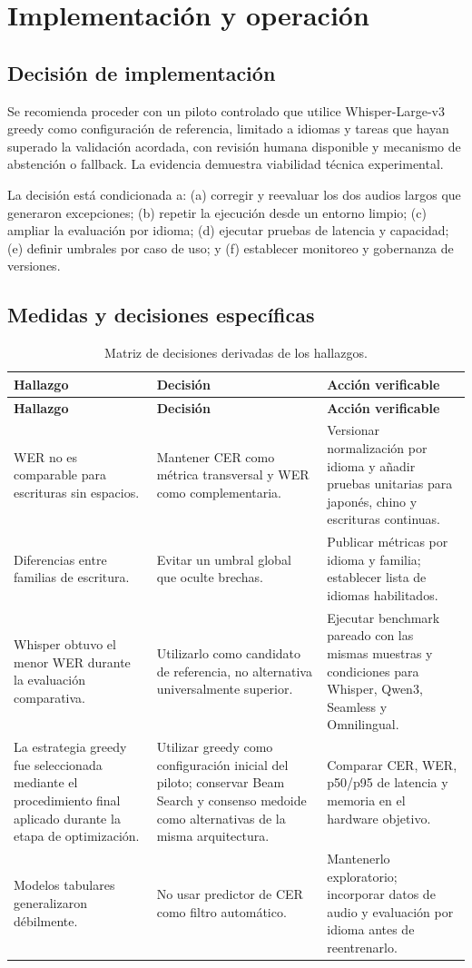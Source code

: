 \documentclass[11pt,letterpaper]{article}
\begin{document}
\section{Implementación y operación}
\subsection{Decisión de implementación}
Se recomienda proceder con un piloto controlado que utilice Whisper-Large-v3 greedy como configuración de referencia, limitado a idiomas y tareas que hayan superado la validación acordada, con revisión humana disponible y mecanismo de abstención o fallback. La evidencia demuestra viabilidad técnica experimental.

La decisión está condicionada a: (a) corregir y reevaluar los dos audios largos que generaron excepciones; (b) repetir la ejecución desde un entorno limpio; (c) ampliar la evaluación por idioma; (d) ejecutar pruebas de latencia y capacidad; (e) definir umbrales por caso de uso; y (f) establecer monitoreo y gobernanza de versiones.

\subsection{Medidas y decisiones específicas}
\begin{longtable}{p{}p{}p{}}
\caption{Matriz de decisiones derivadas de los hallazgos.}\\\toprule
\textbf{Hallazgo} & \textbf{Decisión} & \textbf{Acción verificable}\\\midrule\endfirsthead
\toprule\textbf{Hallazgo} & \textbf{Decisión} & \textbf{Acción verificable}\\\midrule\endhead
WER no es comparable para escrituras sin espacios. & Mantener CER como métrica transversal y WER como complementaria. & Versionar normalización por idioma y añadir pruebas unitarias para japonés, chino y escrituras continuas.\\
Diferencias entre familias de escritura. & Evitar un umbral global que oculte brechas. & Publicar métricas por idioma y familia; establecer lista de idiomas habilitados.\\
Whisper obtuvo el menor WER durante la evaluación comparativa. & Utilizarlo como candidato de referencia, no alternativa universalmente superior. & Ejecutar benchmark pareado con las mismas muestras y condiciones para Whisper, Qwen3, Seamless y Omnilingual.\\
La estrategia greedy fue seleccionada mediante el procedimiento final aplicado durante la etapa de optimización. & Utilizar greedy como configuración inicial del piloto; conservar Beam Search y consenso medoide como alternativas de la misma arquitectura. & Comparar CER, WER, p50/p95 de latencia y memoria en el hardware objetivo.\\
Modelos tabulares generalizaron débilmente. & No usar predictor de CER como filtro automático. & Mantenerlo exploratorio; incorporar datos de audio y evaluación por idioma antes de reentrenarlo.\\
\end{longtable}
\end{document}
